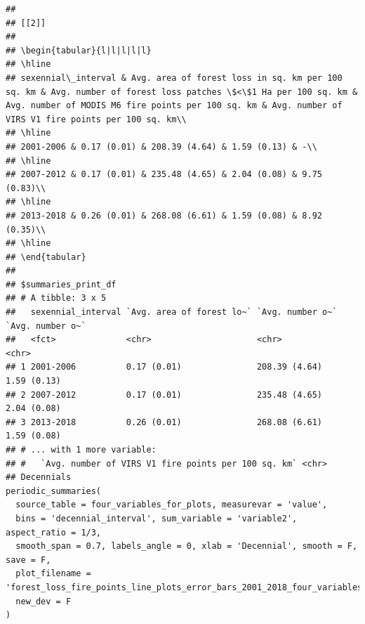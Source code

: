 \documentclass[10pt,landscape,a3paper]{article}
\begin{document}
\begin{verbatim}
## 
## [[2]]
## 
## \begin{tabular}{l|l|l|l|l}
## \hline
## sexennial\_interval & Avg. area of forest loss in sq. km per 100 sq. km & Avg. number of forest loss patches \$<\$1 Ha per 100 sq. km & Avg. number of MODIS M6 fire points per 100 sq. km & Avg. number of VIRS V1 fire points per 100 sq. km\\
## \hline
## 2001-2006 & 0.17 (0.01) & 208.39 (4.64) & 1.59 (0.13) & -\\
## \hline
## 2007-2012 & 0.17 (0.01) & 235.48 (4.65) & 2.04 (0.08) & 9.75 (0.83)\\
## \hline
## 2013-2018 & 0.26 (0.01) & 268.08 (6.61) & 1.59 (0.08) & 8.92 (0.35)\\
## \hline
## \end{tabular}
## 
## $summaries_print_df
## # A tibble: 3 x 5
##   sexennial_interval `Avg. area of forest lo~` `Avg. number o~` `Avg. number o~`
##   <fct>              <chr>                     <chr>            <chr>           
## 1 2001-2006          0.17 (0.01)               208.39 (4.64)    1.59 (0.13)     
## 2 2007-2012          0.17 (0.01)               235.48 (4.65)    2.04 (0.08)     
## 3 2013-2018          0.26 (0.01)               268.08 (6.61)    1.59 (0.08)     
## # ... with 1 more variable:
## #   `Avg. number of VIRS V1 fire points per 100 sq. km` <chr>
## Decennials
periodic_summaries(
  source_table = four_variables_for_plots, measurevar = 'value',
  bins = 'decennial_interval', sum_variable = 'variable2', aspect_ratio = 1/3,
  smooth_span = 0.7, labels_angle = 0, xlab = 'Decennial', smooth = F, save = F,
  plot_filename = 'forest_loss_fire_points_line_plots_error_bars_2001_2018_four_variables_decennial.jpg',
  new_dev = F
)
\end{verbatim}
\end{document}
